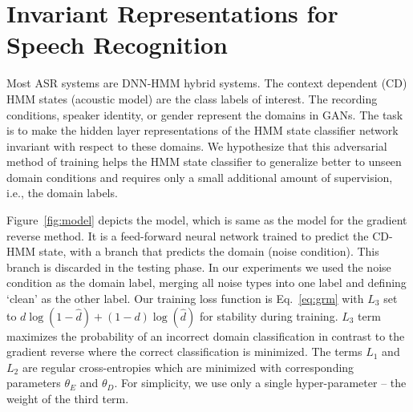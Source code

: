 \documentclass[a4paper]{article}
\begin{document}
\section{Invariant Representations for Speech Recognition}
\label{sec:invariant-speech}

Most ASR systems are DNN-HMM hybrid systems. The context dependent (CD) HMM 
states (acoustic model) are the class labels of interest. The
recording conditions, speaker identity, or gender represent the domains in 
GANs. The task is to make the hidden layer representations of the HMM state classifier network 
invariant with respect to these domains. We hypothesize that this adversarial method of
training helps the HMM state classifier to generalize better to unseen domain conditions and requires only a  
small additional amount of supervision, i.e., the domain labels.  

Figure~\ref{fig:model} depicts the model, which is same as the model for the 
gradient reverse method. It is a feed-forward neural network trained to predict 
the CD-HMM state, with a branch that predicts the domain (noise condition). This 
branch is discarded in the testing phase. In our experiments we
used the noise condition as the domain label, merging all noise types into one label
and defining `clean' as the other label. Our training loss function is Eq.~\ref{eq:grm} with 
$L_3$ set to $d\log(1 - \hat{d}) + (1-d)\log(\hat{d})$ for stability during training. 
$L_3$ term maximizes the probability
of an incorrect domain classification in contrast to the gradient reverse where the 
correct classification is minimized.
The terms $L_1$ and $L_2$ are 
regular cross-entropies which are minimized with corresponding parameters $\theta_E$ and $\theta_D$.
For simplicity, we use only a single hyper-parameter -- the weight of the third term.
\end{document}
